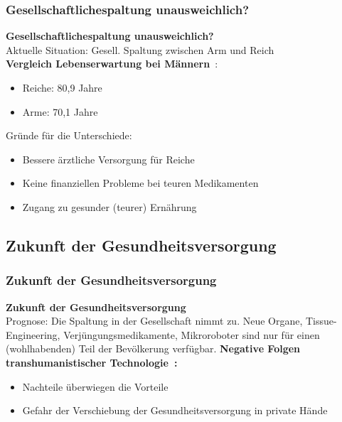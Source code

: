 \documentclass[aspectratio=169,16pt,xcolor=table]{beamer}
\begin{document}
\begin{frame}
  \frametitle{Gesellschaftlichespaltung unausweichlich?}
  \small \textbf{Gesellschaftlichespaltung unausweichlich?}\\
  \small Aktuelle Situation: Gesell. Spaltung zwischen Arm und Reich\\
  \small \textbf{Vergleich Lebenserwartung bei Männern}~\cite{lampert2014}:
  \begin{itemize}
    \item Reiche: 80,9 Jahre
    \item Arme: 70,1 Jahre
  \end{itemize}
  \small Gründe für die Unterschiede:
  \begin{itemize}
    \item Bessere ärztliche Versorgung für Reiche
    \item Keine finanziellen Probleme bei teuren Medikamenten
    \item Zugang zu gesunder (teurer) Ernährung
  \end{itemize}
\end{frame}

\subsection{Zukunft der Gesundheitsversorgung}
\begin{frame}
  \frametitle{Zukunft der Gesundheitsversorgung}
  \small \textbf{Zukunft der Gesundheitsversorgung}\\
  Prognose: Die Spaltung in der Gesellschaft nimmt zu.
  Neue Organe, Tissue-Engineering, Verjüngungsmedikamente, Mikroroboter sind nur für einen (wohlhabenden) Teil der Bevölkerung verfügbar.
  \textbf{Negative Folgen transhumanistischer Technologie~\cite{khan_aziz_2019}:}
  \begin{itemize}
      \item Nachteile überwiegen die Vorteile
      \item Gefahr der Verschiebung der Gesundheitsversorgung in private Hände
  \end{itemize}
\end{frame}
\end{document}
